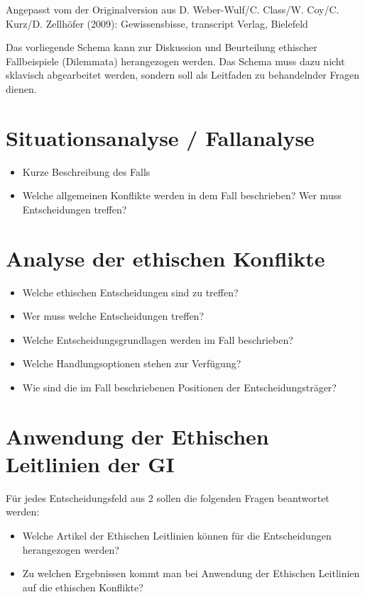\documentclass[10pt, a5paper]{arbeitsblatt}
\begin{document}
\TITEL

{\small Angepasst vom der Originalversion aus D. Weber-Wulf/C. Class/W. Coy/C. Kurz/D. Zellhöfer (2009): Gewissensbisse, transcript Verlag, Bielefeld}\smallskip

Das vorliegende Schema kann zur Diskussion und Beurteilung ethischer Fallbeispiele (Dilemmata) herangezogen werden. Das Schema muss dazu nicht sklavisch abgearbeitet werden, sondern soll als Leitfaden zu behandelnder Fragen dienen.
\section{Situationsanalyse / Fallanalyse}
\begin{itemize}
	\item Kurze Beschreibung des Falls
	\item Welche allgemeinen Konflikte werden in dem Fall beschrieben? Wer muss Entscheidungen treffen?
\end{itemize}

\section{Analyse der ethischen Konflikte}
\begin{itemize}
	\item Welche ethischen Entscheidungen sind zu treffen?
	\item Wer muss welche Entscheidungen treffen?
	\item Welche Entscheidungsgrundlagen werden im Fall beschrieben?
	\item Welche Handlungsoptionen stehen zur Verfügung?
	\item Wie sind die im Fall beschriebenen Positionen der Entscheidungsträger?
\end{itemize}

\section{Anwendung der Ethischen Leitlinien der GI}
Für jedes Entscheidungsfeld aus 2 sollen die folgenden Fragen beantwortet werden:
\begin{itemize}
	\item Welche Artikel der Ethischen Leitlinien können für die Entscheidungen herangezogen werden?
	\item Zu welchen Ergebnissen kommt man bei Anwendung der Ethischen Leitlinien auf die ethischen Konflikte?
\end{itemize}
\end{document}
